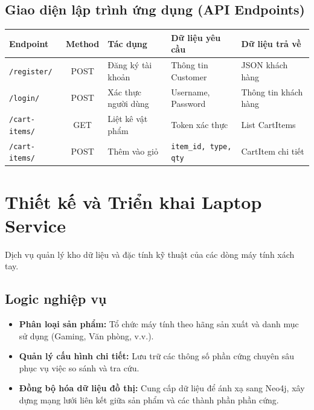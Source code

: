 \documentclass[12pt,a4paper]{report}
\begin{document}
\subsection{Giao diện lập trình ứng dụng (API Endpoints)}
\begin{table}[h!]
\centering
\begin{tabular}{|l|c|p{4cm}|p{3cm}|p{3cm}|}
\hline
\textbf{Endpoint} & \textbf{Method} & \textbf{Tác dụng} & \textbf{Dữ liệu yêu cầu} & \textbf{Dữ liệu trả về} \\ \hline
\texttt{/register/} & POST & Đăng ký tài khoản & Thông tin Customer & JSON khách hàng \\ \hline
\texttt{/login/} & POST & Xác thực người dùng & Username, Password & Thông tin khách hàng \\ \hline
\texttt{/cart-items/} & GET & Liệt kê vật phẩm & Token xác thực & List CartItems \\ \hline
\texttt{/cart-items/} & POST & Thêm vào giỏ & \texttt{item\_id, type, qty} & CartItem chi tiết \\ \hline
\end{tabular}
\end{table}

\section{Thiết kế và Triển khai Laptop Service}
Dịch vụ quản lý kho dữ liệu và đặc tính kỹ thuật của các dòng máy tính xách tay.

\subsection{Logic nghiệp vụ}
\begin{itemize}
    \item \textbf{Phân loại sản phẩm:} Tổ chức máy tính theo hãng sản xuất và danh mục sử dụng (Gaming, Văn phòng, v.v.).
    \item \textbf{Quản lý cấu hình chi tiết:} Lưu trữ các thông số phần cứng chuyên sâu phục vụ việc so sánh và tra cứu.
    \item \textbf{Đồng bộ hóa dữ liệu đồ thị:} Cung cấp dữ liệu để ánh xạ sang Neo4j, xây dựng mạng lưới liên kết giữa sản phẩm và các thành phần phần cứng.
\end{itemize}
\end{document}

